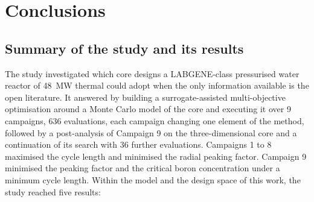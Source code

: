 \chapter{Conclusions}
\label{ch:conclusions}

\section{Summary of the study and its results}
\label{sec:concl-answer}

The study investigated which core designs a LABGENE-class pressurised
water reactor of \SI{48}{MW} thermal could adopt when the only
information available is the open literature. It answered by building
a surrogate-assisted multi-objective optimisation around a Monte Carlo
model of the core and executing it over 9 campaigns, 636 evaluations,
each campaign changing one element of the method, followed by a
post-analysis of Campaign 9 on the three-dimensional core and a
continuation of its search with 36 further evaluations. Campaigns 1 to
8 maximised the cycle length and minimised the radial peaking factor.
Campaign 9 minimised the peaking factor and the critical boron concentration under a minimum cycle length. Within the model and the design space of this work, the study reached five results:

